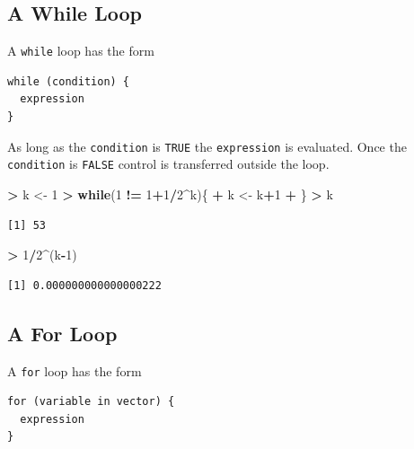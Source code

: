 \documentclass[]{krantz}
\makeatletter
\newenvironment{Shaded}{\begin{snugshade}}{\end{snugshade}}
\newcommand{\DecValTok}[1]{\textcolor[rgb]{0.06,0.06,0.06}{#1}}
\newcommand{\StringTok}[1]{\textcolor[rgb]{0.5,0.5,0.5}{#1}}
\newcommand{\ControlFlowTok}[1]{\textcolor[rgb]{0.27,0.27,0.27}{\textbf{#1}}}
\newcommand{\OperatorTok}[1]{\textcolor[rgb]{0.43,0.43,0.43}{\textbf{#1}}}
\newcommand{\NormalTok}[1]{#1}
\newenvironment{kframe}{%
\medskip{}
\setlength{\fboxsep}{.8em}
 \def\at@end@of@kframe{}%
 \ifinner\ifhmode%
  \def\at@end@of@kframe{\end{minipage}}%
  \begin{minipage}{\columnwidth}%
 \fi\fi%
 \def\FrameCommand##1{\hskip\@totalleftmargin \hskip-\fboxsep
 \colorbox{shadecolor}{##1}\hskip-\fboxsep
     \hskip-\linewidth \hskip-\@totalleftmargin \hskip\columnwidth}%
 \MakeFramed {\advance\hsize-\width
   \@totalleftmargin\z@ \linewidth\hsize
   \@setminipage}}%
 {\par\unskip\endMakeFramed%
 \at@end@of@kframe}
\renewenvironment{Shaded}{\begin{kframe}}{\end{kframe}}
\makeatother
\begin{document}
\subsection{A While Loop}\label{a-while-loop}

A \texttt{while} loop has the form

\begin{verbatim}
while (condition) {
  expression
}
\end{verbatim}

As long as the \texttt{condition} is \texttt{TRUE} the
\texttt{expression} is evaluated. Once the \texttt{condition} is
\texttt{FALSE} control is transferred outside the loop.

\begin{Shaded}
\begin{Highlighting}[]
\OperatorTok{>}\StringTok{ }\NormalTok{k <-}\StringTok{ }\DecValTok{1}
\OperatorTok{>}\StringTok{ }\ControlFlowTok{while}\NormalTok{(}\DecValTok{1} \OperatorTok{!=}\StringTok{ }\DecValTok{1}\OperatorTok{+}\DecValTok{1}\OperatorTok{/}\DecValTok{2}\OperatorTok{^}\NormalTok{k)\{}
\OperatorTok{+}\StringTok{     }\NormalTok{k <-}\StringTok{ }\NormalTok{k}\OperatorTok{+}\DecValTok{1} 
\OperatorTok{+}\StringTok{ }\NormalTok{\}}
\OperatorTok{>}\StringTok{ }\NormalTok{k}
\end{Highlighting}
\end{Shaded}

\begin{verbatim}
[1] 53
\end{verbatim}

\begin{Shaded}
\begin{Highlighting}[]
\OperatorTok{>}\StringTok{ }\DecValTok{1}\OperatorTok{/}\DecValTok{2}\OperatorTok{^}\NormalTok{(k}\OperatorTok{-}\DecValTok{1}\NormalTok{)}
\end{Highlighting}
\end{Shaded}

\begin{verbatim}
[1] 0.000000000000000222
\end{verbatim}

\subsection{A For Loop}\label{a-for-loop}

A \texttt{for} loop has the form

\begin{verbatim}
for (variable in vector) {
  expression
}
\end{verbatim}
\end{document}
